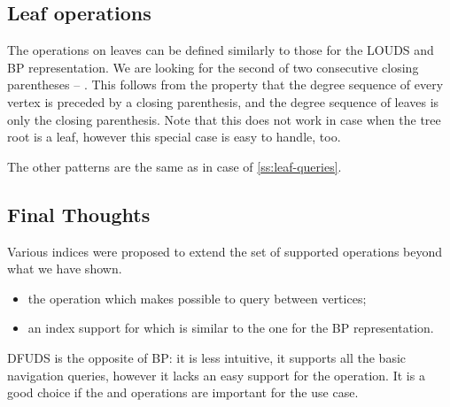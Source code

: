 \subsection{Leaf operations}

The operations on leaves can be defined similarly to those for the LOUDS and BP representation.
We are looking for the second of two consecutive closing parentheses -- \str{))}.
This follows from the property that the degree sequence of every vertex is preceded by a closing parenthesis, and the degree sequence of leaves is only the closing parenthesis.
Note that this does not work in case when the tree root is a leaf, however this special case is easy to handle, too.

The other patterns are the same as in case of \ref{ss:leaf-queries}.

\subsection{Final Thoughts}

Various indices were proposed to extend the set of supported operations beyond what we have shown.
\begin{itemize}
	\item the operation \dep{} which makes possible to query \distance{} between vertices;
	\item an index support for \levelAncestor{} which is similar to the one for the BP representation.
\end{itemize}

DFUDS is the opposite of BP: it is less intuitive, it supports all the basic navigation queries, however it lacks an easy support for the \dep{} operation.
It is a good choice if the \preRank{} and \childAny{} operations are important for the use case.